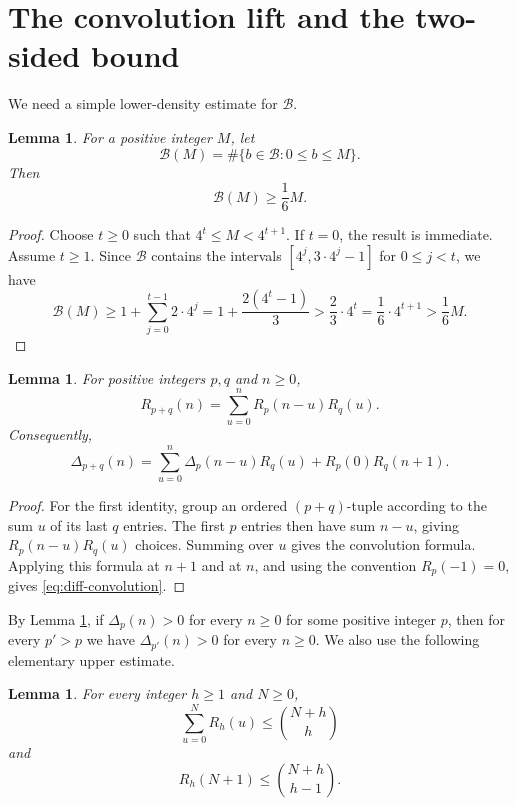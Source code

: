 \documentclass[11pt]{amsart}
\newtheorem{lemma}[theorem]{Lemma}
\theoremstyle{remark}
\theoremstyle{plain}
\newcommand{\BaseB}{\mathcal B}
\begin{document}
\section{The convolution lift and the two-sided bound}

We need a simple lower-density estimate for $\BaseB$.

\begin{lemma}\label{lem:density}
For a positive integer $M$, let
\[
\BaseB(M)=\#\{b\in \BaseB:0\le b\le M\}.
\]
Then
\[\BaseB(M)\ge \frac16 M.
\]
\end{lemma}

\begin{proof}
Choose $t\ge 0$ such that $4^t\le M<4^{t+1}$. If $t=0$, the result is immediate. Assume $t\ge 1$. Since $\BaseB$ contains the intervals $[4^j,3\cdot 4^j-1]$ for $0\le j<t$, we have
\[\BaseB(M)\ge 1+\sum_{j=0}^{t-1}2\cdot 4^j=1+\frac{2(4^t-1)}3>\frac23 \cdot4^t=\frac16 \cdot4^{t+1}>\frac16 M.
\]
\end{proof}

\begin{lemma}\label{lem:convolution}
For positive integers $p,q$ and $n\ge 0$,
\[
R_{p+q}(n)=\sum_{u=0}^n R_p(n-u)R_q(u).
\]
Consequently,
\begin{equation}\label{eq:diff-convolution}
\Delta_{p+q}(n)=\sum_{u=0}^n \Delta_p(n-u)R_q(u)+R_p(0)R_q(n+1).
\end{equation}
\end{lemma}

\begin{proof}
For the first identity, group an ordered $(p+q)$-tuple according to the sum $u$ of its last $q$ entries. The first $p$ entries then have sum $n-u$, giving $R_p(n-u)R_q(u)$ choices. Summing over $u$ gives the convolution formula. Applying this formula at $n+1$ and at $n$, and using the convention $R_p(-1)=0$, gives \eqref{eq:diff-convolution}.
\end{proof}

By Lemma \ref{lem:convolution}, if $\Delta _p(n)>0$ for every $n\ge 0$ for some positive integer $p$, then for every $p'>p$ we have $\Delta _{p'}(n)>0$ for every $n\ge 0$. We also use the following elementary upper estimate.

\begin{lemma}\label{lem:upper-elementary}
For every integer $h\ge 1$ and $N\ge 0$,
\[
\sum_{u=0}^N R_h(u)\le \binom{N+h}{h}
\]
and
\[
R_h(N+1)\le \binom{N+h}{h-1}.
\]
\end{lemma}
\end{document}
